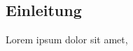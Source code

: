 
\begin{newpage}
	
	\section{Einleitung} %
	\label{sec:Einleitung}
		Lorem ipsum dolor sit amet,
	
	
\end{newpage}